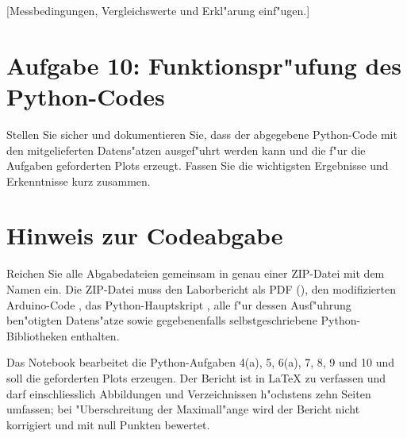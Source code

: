 \documentclass[a4paper,oneside,10pt]{article}%
\begin{document}
[Messbedingungen, Vergleichswerte und Erkl"arung einf"ugen.]

\section{Aufgabe 10: Funktionspr"ufung des Python-Codes}
\label{sec:zusammenfassung}

Stellen Sie sicher und dokumentieren Sie, dass der abgegebene Python-Code  mit den mitgelieferten Datens"atzen ausgef"uhrt werden kann und die f"ur die Aufgaben geforderten Plots erzeugt. Fassen Sie die wichtigsten Ergebnisse und Erkenntnisse kurz zusammen.

\section*{Hinweis zur Codeabgabe}
Reichen Sie alle Abgabedateien gemeinsam in genau einer ZIP-Datei mit dem Namen  ein. Die ZIP-Datei muss den Laborbericht als PDF (), den modifizierten Arduino-Code , das Python-Hauptskript , alle f"ur dessen Ausf"uhrung ben"otigten Datens"atze sowie gegebenenfalls selbstgeschriebene Python-Bibliotheken enthalten.

Das Notebook bearbeitet die Python-Aufgaben 4(a), 5, 6(a), 7, 8, 9 und 10 und soll die geforderten Plots erzeugen. Der Bericht ist in LaTeX zu verfassen und darf einschliesslich Abbildungen und Verzeichnissen h"ochstens zehn Seiten umfassen; bei "Uberschreitung der Maximall"ange wird der Bericht nicht korrigiert und mit null Punkten bewertet.

	

\end{document}
